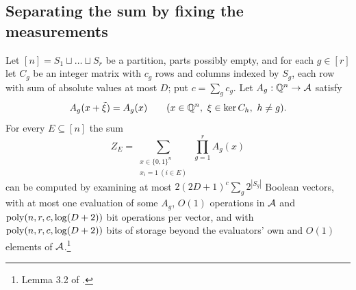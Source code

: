 \subsection{Separating the sum by fixing the measurements}
\begin{lemma}[Separation]\label{lem:separation}
Let $[n]=S_1\sqcup\dots\sqcup S_r$ be a partition, parts possibly empty, and
for each $g\in[r]$ let $C_g$ be an integer matrix with $c_g$ rows and columns
indexed by $S_g$, each row with sum of absolute values at most $D$; put
$c=\sum_g c_g$. Let $A_g:\mathbb{Q}^n\to\mathcal{A}$ satisfy
\begin{equation}\label{eq:invariance}
  A_g(x+\tilde\xi)=A_g(x)\qquad(x\in\mathbb{Q}^n,\ \xi\in\ker C_h,\ h\ne g).
\end{equation}
For every $E\subseteq[n]$ the sum
\[
  Z_E=\sum_{\substack{x\in\{0,1\}^n\\ x_i=1\ (i\in E)}}\ \prod_{g=1}^{r}A_g(x)
\]
can be computed by examining at most $2(2D+1)^{c}\sum_{g}2^{|S_g|}$ Boolean
vectors, with at most one evaluation of some $A_g$, $O(1)$ operations in $\mathcal{A}$ and
$\operatorname{poly}(n,r,c,\log(D+2))$ bit operations per vector, and with $\operatorname{poly}(n,r,c,\log(D+2))$
bits of storage beyond the evaluators' own and $O(1)$ elements of
$\mathcal{A}$.\footnote{Lemma 3.2 of \cite{OAI26}.}
\end{lemma}

